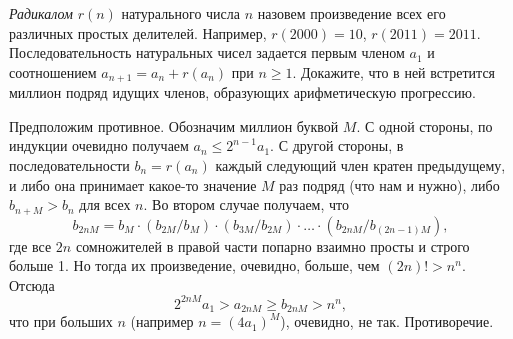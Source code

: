 \problem
\emph{Радикалом} $r(n)$ натурального числа $n$ назовем произведение всех его
различных простых делителей.
Например, $r(2000) = 10$, $r(2011) = 2011$.
Последовательность натуральных чисел задается первым членом $a_1$ и
соотношением $a_{n + 1} = a_n + r(a_n)$ при $n \geq 1$.
Докажите, что в ней встретится миллион подряд идущих членов, образующих
арифметическую прогрессию.

\solution
Предположим противное.
Обозначим миллион буквой $M$.
С одной стороны, по индукции очевидно получаем $a_n \leq 2^{n - 1} a_1$.
С другой стороны, в последовательности $b_n = r(a_n)$ каждый следующий член
кратен предыдущему, и либо она принимает какое-то значение $M$ раз подряд
(что нам и нужно), либо $b_{n + M} > b_{n}$ для всех $n$.
Во втором случае получаем, что
\[
    b_{2 n M}
=
    b_M \cdot (b_{2 M} / b_M) \cdot (b_{3 M} / b_{2 M})
    \cdot \ldots \cdot
    (b_{2 n M} / b_{(2 n - 1) M})
,\]
где все $2 n$ сомножителей в правой части попарно взаимно просты и строго
больше 1.
Но тогда их произведение, очевидно, больше, чем $(2 n)! > n^n$.
Отсюда 
\[
    2^{2 n M} a_1
>
    a_{2 n M}
\geq
    b_{2 n M}
>
    n^n
,\]
что при больших $n$ (например $n = (4 a_1)^M$), очевидно, не так.
Противоречие.

\endproblem
